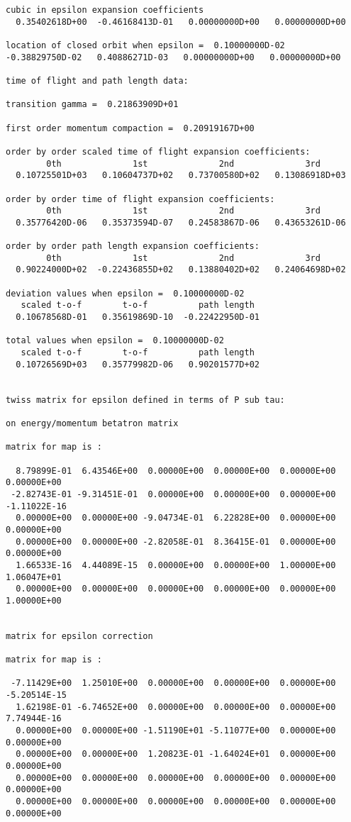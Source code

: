 \begin{footnotesize}
\begin{verbatim}
cubic in epsilon expansion coefficients
  0.35402618D+00  -0.46168413D-01   0.00000000D+00   0.00000000D+00

location of closed orbit when epsilon =  0.10000000D-02
-0.38829750D-02   0.40886271D-03   0.00000000D+00   0.00000000D+00

time of flight and path length data:

transition gamma =  0.21863909D+01

first order momentum compaction =  0.20919167D+00

order by order scaled time of flight expansion coefficients:
        0th              1st              2nd              3rd
  0.10725501D+03   0.10604737D+02   0.73700580D+02   0.13086918D+03

order by order time of flight expansion coefficients:
        0th              1st              2nd              3rd
  0.35776420D-06   0.35373594D-07   0.24583867D-06   0.43653261D-06

order by order path length expansion coefficients:
        0th              1st              2nd              3rd
  0.90224000D+02  -0.22436855D+02   0.13880402D+02   0.24064698D+02

deviation values when epsilon =  0.10000000D-02
   scaled t-o-f        t-o-f          path length
  0.10678568D-01   0.35619869D-10  -0.22422950D-01

total values when epsilon =  0.10000000D-02
   scaled t-o-f        t-o-f          path length
  0.10726569D+03   0.35779982D-06   0.90201577D+02


twiss matrix for epsilon defined in terms of P sub tau:

on energy/momentum betatron matrix

matrix for map is :

  8.79899E-01  6.43546E+00  0.00000E+00  0.00000E+00  0.00000E+00   0.00000E+00
 -2.82743E-01 -9.31451E-01  0.00000E+00  0.00000E+00  0.00000E+00  -1.11022E-16
  0.00000E+00  0.00000E+00 -9.04734E-01  6.22828E+00  0.00000E+00   0.00000E+00
  0.00000E+00  0.00000E+00 -2.82058E-01  8.36415E-01  0.00000E+00   0.00000E+00
  1.66533E-16  4.44089E-15  0.00000E+00  0.00000E+00  1.00000E+00   1.06047E+01
  0.00000E+00  0.00000E+00  0.00000E+00  0.00000E+00  0.00000E+00   1.00000E+00


matrix for epsilon correction

matrix for map is :

 -7.11429E+00  1.25010E+00  0.00000E+00  0.00000E+00  0.00000E+00  -5.20514E-15
  1.62198E-01 -6.74652E+00  0.00000E+00  0.00000E+00  0.00000E+00   7.74944E-16
  0.00000E+00  0.00000E+00 -1.51190E+01 -5.11077E+00  0.00000E+00   0.00000E+00
  0.00000E+00  0.00000E+00  1.20823E-01 -1.64024E+01  0.00000E+00   0.00000E+00
  0.00000E+00  0.00000E+00  0.00000E+00  0.00000E+00  0.00000E+00   0.00000E+00
  0.00000E+00  0.00000E+00  0.00000E+00  0.00000E+00  0.00000E+00   0.00000E+00



\end{verbatim}
\end{footnotesize}

